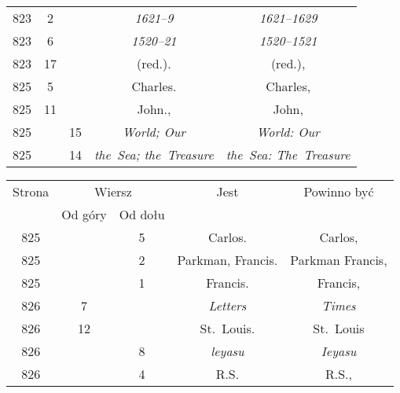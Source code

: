 \documentclass[a4paper,11pt]{article}
\begin{document}
\begin{center}
\begin{tabular}{|c|c|c|c|c|}
    823 &  2 & & \textit{1621--9} & \textit{1621--1629} \\
    823 &  6 & & \textit{1520--21} & \textit{1520--1521} \\
    823 & 17 & & (red.). & (red.), \\
    825 &  5 & & Charles. & Charles, \\
    825 & 11 & & John., & John, \\
    825 & & 15 & \textit{World; Our} & \textit{World: Our} \\
    825 & & 14 & \textit{the~Sea; the~Treasure}
           & \textit{the~Sea: The~Treasure} \\
    \hline
  \end{tabular}





  \begin{tabular}{|c|c|c|c|c|}
    \hline
    Strona & \multicolumn{2}{c|}{Wiersz} & Jest
                              & Powinno być \\ \cline{2-3}
    & Od góry & Od dołu & & \\
    \hline
    825 & &  5 & Carlos. & Carlos, \\
    825 & &  2 & Parkman, Francis. & Parkman Francis, \\
    825 & &  1 & Francis. & Francis, \\
    826 &  7 & & \textit{Letters} & \textit{Times} \\
    826 & 12 & & St.~Louis. & St.~Louis \\
    826 & &  8 & \textit{leyasu} & \textit{Ieyasu} \\
    826 & &  4 & R.S. & R.S., \\

\end{tabular}
\end{center}
\end{document}
